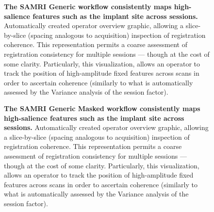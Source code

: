 \begin{figure}[h!]
	\centering
	\setlength{\fboxsep}{0pt}%
	\setlength{\fboxrule}{0.2pt}%
	\caption{
		\textbf{The SAMRI Generic workflow consistently maps high-salience features such as the implant site across sessions.}
		Automatically created operator overview graphic, allowing a slice-by-slice (spacing analogous to acquisition) inspection of registration coherence.
		This representation permits a coarse assessment of registration consistency for multiple sessions --- though at the cost of some clarity.
		Particularly, this visualization, allows an operator to track the position of high-amplitude fixed features across scans in order to ascertain coherence (similarly to what is automatically assessed by the Variance analysis of the session factor).
		}
 	\label{fig:coherence}
\end{figure}

\begin{figure}[h!]
	\centering
	\setlength{\fboxsep}{0pt}%
	\setlength{\fboxrule}{0.2pt}%
	\caption{
		\textbf{The SAMRI Generic Masked workflow consistently maps high-salience features such as the implant site across sessions.}
		Automatically created operator overview graphic, allowing a slice-by-slice (spacing analogous to acquisition) inspection of registration coherence.
		This representation permits a coarse assessment of registration consistency for multiple sessions --- though at the cost of some clarity.
		Particularly, this visualization, allows an operator to track the position of high-amplitude fixed features across scans in order to ascertain coherence (similarly to what is automatically assessed by the Variance analysis of the session factor).
		}
 	\label{fig:coherence}
\end{figure}

